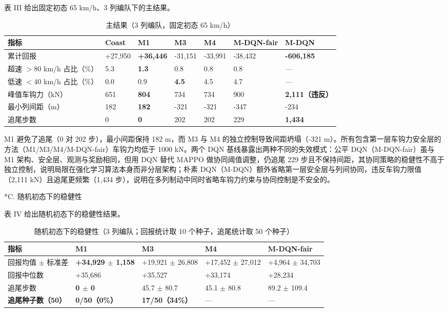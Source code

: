 \documentclass[11pt]{article}
\makeatletter
\renewcommand{\subsection}{\@startsection{subsection}{2}{\z@}{-3.25ex\@plus -1ex \@minus -.2ex}{1.5ex \@plus .2ex}{\normalfont\normalsize\bfseries\sffamily}}
\makeatother
\begin{document}
表 III 给出固定初态 65 km/h、3 列编队下的主结果。



\begin{table}[htbp]
\centering
\caption{主结果（3 列编队，固定初态 65 km/h）}
\begin{tabular}{lllllll}
\toprule
指标 & Coast & \textbf{M1} & M3 & M4 & M-DQN-fair & M-DQN \\
\midrule
累计回报 & +27{,}950 & \textbf{+36{,}446} & -31{,}151 & -33{,}991 & -38{,}432 & \textbf{-606{,}185} \\
超速 $>$80 km/h 占比（\%） & 5.3 & \textbf{1.3} & 0.8 & 0.8 & 0.8 & — \\
低速 $<$40 km/h 占比（\%） & 0.0 & 0.9 & \textbf{4.5} & 4.5 & 4.7 & — \\
峰值车钩力（kN） & 651 & \textbf{804} & 734 & 734 & 900 & \textbf{2{,}111（违反）} \\
最小列间距（m） & 182 & \textbf{182} & -321 & -321 & -347 & -234 \\
追尾步数 & 0 & \textbf{0} & 202 & 202 & 229 & \textbf{1{,}434} \\
\bottomrule
\end{tabular}
\end{table}

M1 避免了追尾（0 对 202 步），最小间距保持 182 m，而 M3 与 M4 的独立控制导致间距坍塌（-321 m）。所有包含第一层车钩力安全层的方法（M1/M3/M4/M-DQN-fair）车钩力均低于 1000 kN。两个 DQN 基线暴露出两种不同的失效模式：公平 DQN（M-DQN-fair）虽与 M1 架构、安全层、观测与奖励相同，但用 DQN 替代 MAPPO 做协同阈值调整，仍追尾 229 步且不保持间距，其协同策略的稳健性不高于独立控制，说明局限在强化学习算法本身而非分层架构；朴素 DQN（M-DQN）额外省略第一层安全层与列间协同，违反车钩力限值（2{,}111 kN）且追尾更频繁（1{,}434 步），说明在多列制动中同时省略车钩力约束与协同控制是不安全的。


\subsection*{C. 随机初态下的稳健性}

表 IV 给出随机初态下的稳健性结果。



\begin{table}[htbp]
\centering
\caption{随机初态下的稳健性（3 列编队；回报统计取 10 个种子，追尾统计取 50 个种子）}
\begin{tabular}{lllll}
\toprule
指标 & \textbf{M1} & M3 & M4 & M-DQN-fair \\
\midrule
回报均值 $\pm$ 标准差 & \textbf{+34{,}929 $\pm$ 1{,}158} & +19{,}921 $\pm$ 26{,}808 & +17{,}452 $\pm$ 27{,}012 & +4{,}964 $\pm$ 34{,}703 \\
回报中位数 & +35{,}686 & +35{,}527 & +33{,}174 & +28{,}234 \\
追尾步数 & \textbf{0 $\pm$ 0} & 45.7 $\pm$ 80.7 & 45.1 $\pm$ 80.8 & 89.2 $\pm$ 109.4 \\
\textbf{追尾种子数（50）} & \textbf{0/50（0\%）} & \textbf{17/50（34\%）} & — & — \\
\bottomrule
\end{tabular}
\end{table}
\end{document}
